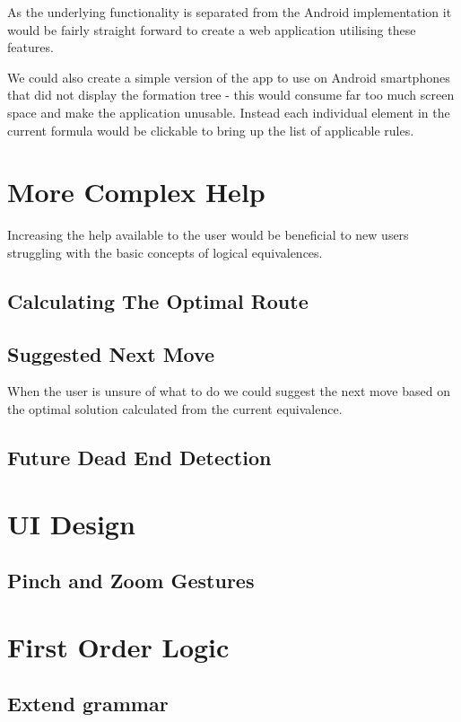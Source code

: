 \documentclass{report}
\begin{document}
As the underlying functionality is separated from the Android implementation it would be fairly straight forward to create a web application utilising these features. 

We could also create a simple version of the app to use on Android smartphones that did not display the formation tree - this would consume far too much screen space and make the application unusable. Instead each individual element in the current formula would be clickable to bring up the list of applicable rules. 

\section{More Complex Help}

Increasing the help available to the user would be beneficial to new users struggling with the basic concepts of logical equivalences.

\subsection{Calculating The Optimal Route}



\subsection{Suggested Next Move}

When the user is unsure of what to do we could suggest the next move based on the optimal solution calculated from the current equivalence.

\subsection{Future Dead End Detection}

\section{UI Design}
\subsection{Pinch and Zoom Gestures}

\section{First Order Logic}
\subsection{Extend grammar}
\end{document}
